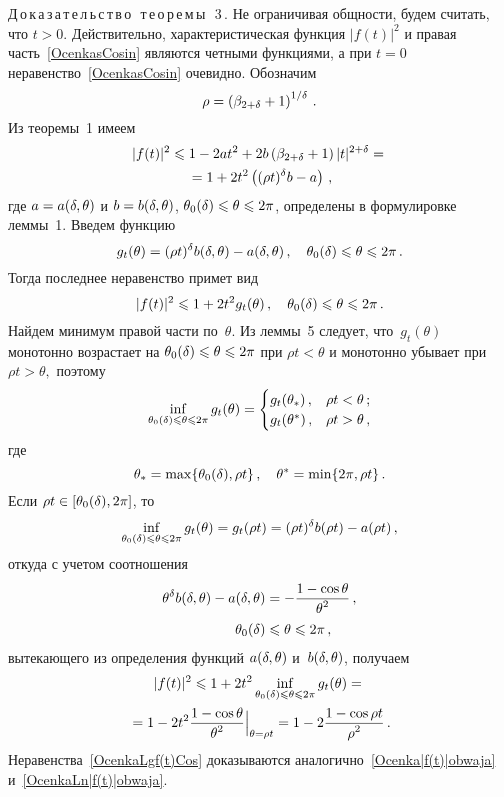 \begin{multicols}{2}
\noindent
Д\,о\,к\,а\,з\,а\,т\,е\,л\,ь\,с\,т\,в\,о\,\ т\,е\,о\,р\,е\,м\,ы\,\ 3\,.
Не ограничивая общности, будем считать, что $t>0$. Действительно,
характеристическая функция $|f(t)|^2$ и правая
часть~\eqref{OcenkasCosin} являются четными функциями, а при $t=0$
неравенство~\eqref{OcenkasCosin} очевидно. Обозначим
$$
\rho=\left(\beta_{2+\delta}+1\right)^{1/\delta}\,.
$$
Из теоремы~1 имеем
\begin{multline}
\label{|f(t)|^2<=a+b_bez_alpha}
|f(t)|^2\leqslant 1-2at^2+2b
\left(\beta_{2+\delta}+1\right)|t|^{2+\delta}={}\\
{}=
1+2t^2\left((\rho t)^\delta
b-a\right)\,,
\end{multline}
где $a=a(\delta,\theta)$ и $b=b(\delta,\theta)$,
$\theta_0(\delta)\leqslant\theta\leqslant2\pi$, определены в формулировке
леммы~1. Введем функцию
$$
g_t(\theta)=(\rho t)^\delta b(\delta,\theta)-a(\delta,\theta)\,,\quad
\theta_0(\delta)\leqslant\theta\leqslant2\pi\,.
$$
Тогда последнее неравенство примет вид
$$
|f(t)|^2\leqslant 1+2t^2g_t(\theta)\,,\quad \theta_0(\delta)\leqslant\theta\leqslant2\pi\,.
$$
Найдем минимум правой части по~$\theta$. Из леммы~5
следует, что~$g_t(\theta)$ монотонно возрастает на
$\theta_0(\delta)\leqslant\theta\leqslant2\pi$ при $\rho t<\theta$ и монотонно
убывает при $\rho t>\theta,$ поэтому
$$
\inf_{\theta_0(\delta)\leqslant\theta\leqslant2\pi}g_t(\theta)=
\begin{cases}
g_t(\theta_*)\,,&\rho t<\theta\,;\\
g_t(\theta^*)\,,&\rho t>\theta\,,
\end{cases}
$$
где
$$
\theta_*=\max\{\theta_0(\delta),\rho t\}\,, \quad \theta^*=\min\{2\pi,\rho
t\}\,.
$$
Если $\rho t\in[\theta_0(\delta),2\pi]$, то
$$
\inf_{\theta_0(\delta)\leqslant\theta\leqslant2\pi}g_t(\theta)= g_t(\rho t)= (\rho
t)^{\delta}b(\rho t)-a(\rho t)\,,
$$
откуда с учетом соотношения
\begin{align*}
\theta^\delta b(\delta,\theta)-a(\delta,\theta)&=
-\displaystyle\frac{\displaystyle 1-\cos\theta\mathstrut}{\displaystyle \theta^2\mathstrut}\,,\\
\theta_0(\delta)&\leqslant\theta\leqslant2\pi\,,
\end{align*}
вытекающего из определения функций $a(\delta,\theta)$ и~$b(\delta,\theta)$,
получаем
\begin{multline*}
|f(t)|^2\leqslant1+2t^2\inf_{\theta_0(\delta)\leqslant\theta\leqslant2\pi}g_t(\theta)={}\\
{}=
1-2t^2 \displaystyle\frac{\displaystyle 1-\cos\theta\mathstrut}{\displaystyle \theta^2\mathstrut} \Big\vert_{\theta=\rho t}= 1-2 \displaystyle\frac{\displaystyle 1-\cos\rho t\mathstrut}{\displaystyle \rho^2\mathstrut}\,.
\end{multline*}
Неравенства~\eqref{OcenkaLgf(t)Cos} доказываются
аналогично~\eqref{Ocenka|f(t)|obwaja} и~\eqref{OcenkaLn|f(t)|obwaja}.

\medskip


\end{multicols}
